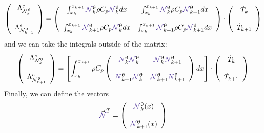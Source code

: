 \[
\left(
\begin{array}{c}
{\Lambda}_{\bN_k^\uptheta}^e  \\ \\ 
{\Lambda}_{\bN_{k+1}^\uptheta}^e
\end{array}
\right)
=
\left(
\begin{array}{cc}
\int_{x_k}^{x_{k+1}} {\color{Violet}\bN}_k^\uptheta        \rho C_p {\color{Violet}\bN}_{k}^\uptheta dx  
&  \int_{x_k}^{x_{k+1}} {\color{Violet}\bN}_k^\uptheta     \rho C_p {\color{Violet}\bN}_{k+1}^\uptheta dx\\ \\
\int_{x_k}^{x_{k+1}} {\color{Violet}\bN}_{k+1}^\uptheta    \rho C_p {\color{Violet}\bN}_{k}^\uptheta dx  
&  \int_{x_k}^{x_{k+1}} {\color{Violet}\bN}_{k+1}^\uptheta \rho C_p {\color{Violet}\bN}_{k+1}^\uptheta dx 
\end{array}
\right)
\cdot
\left(
\begin{array}{c}
\dot{T}_k \\ \\
\dot{T}_{k+1}
\end{array}
\right)
\]
and we can take the integrals outside of the matrix:
\[
\left(
\begin{array}{c}
{\Lambda}_{\bN_k^\uptheta}^e \\ \\ {\Lambda}_{\bN_{k+1}^\uptheta}^e
\end{array}
\right)
=
\left[
\int_{x_k}^{x_{k+1}}
\rho C_p
\left(
\begin{array}{cc}
{\color{Violet}N}_k^\uptheta     {\color{Violet}\bN}_{k}^\uptheta 
&  {\color{Violet}\bN}_k^\uptheta     {\color{Violet}N}_{k+1}^\uptheta  \\ \\
{\color{Violet}N}_{k+1}^\uptheta {\color{Violet}\bN}_{k}^\uptheta 
&  {\color{Violet}\bN}_{k+1}^\uptheta {\color{Violet}N}_{k+1}^\uptheta 
\end{array}
\right)
dx
\right]
\cdot
\left(
\begin{array}{c}
\dot{T}_k \\ \\ 
\dot{T}_{k+1}
\end{array}
\right)
\]
Finally, we can define the vectors 
\[
{\vec {\color{Violet}\bN}}^T = 
\left(
\begin{array}{c}
{\color{Violet}\bN}_k^\uptheta(x)  \\ \\  {\color{Violet}\bN}_{k+1}^\uptheta (x)
\end{array}
\right)
\]
